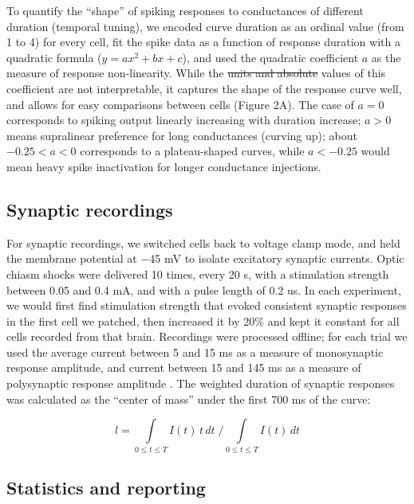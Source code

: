 \documentclass{article}
\providecommand{\DIFaddtex}[1]{{\protect\color{blue}\uwave{#1}}} %
\providecommand{\DIFdeltex}[1]{{\protect\color{red}\sout{#1}}}                      %
\providecommand{\DIFaddbegin}{} %
\providecommand{\DIFaddend}{} %
\providecommand{\DIFdelbegin}{} %
\providecommand{\DIFdelend}{} %
\providecommand{\DIFadd}[1]{\texorpdfstring{\DIFaddtex{#1}}{#1}} %
\providecommand{\DIFdel}[1]{\texorpdfstring{\DIFdeltex{#1}}{}} %
\newcommand{\DIFscaledelfig}{0.5}
\newlength{\DIFdelgraphicswidth} %
\newlength{\DIFdelgraphicsheight} %
\newcommand{\DIFaddincludegraphics}[2][]{{\color{blue}\fbox{\DIFOincludegraphics[#1]{#2}}}} %
\newcommand{\DIFdelincludegraphics}[2][]{%
\sbox{\DIFdelgraphicsbox}{\DIFOincludegraphics[#1]{#2}}%
\settoboxwidth{\DIFdelgraphicswidth}{\DIFdelgraphicsbox} %
\settoboxtotalheight{\DIFdelgraphicsheight}{\DIFdelgraphicsbox} %
\scalebox{\DIFscaledelfig}{%
\parbox[b]{\DIFdelgraphicswidth}{\usebox{\DIFdelgraphicsbox}\\[-\baselineskip] \rule{\DIFdelgraphicswidth}{0em}}\llap{\resizebox{\DIFdelgraphicswidth}{\DIFdelgraphicsheight}{%
\setlength{\unitlength}{\DIFdelgraphicswidth}%
\begin{picture}(1,1)%
\thicklines\linethickness{2pt} %
{\color[rgb]{1,0,0}\put(0,0){\framebox(1,1){}}}%
{\color[rgb]{1,0,0}\put(0,0){\line( 1,1){1}}}%
{\color[rgb]{1,0,0}\put(0,1){\line(1,-1){1}}}%
\end{picture}%
}\hspace*{3pt}}} %
} %
\DeclareRobustCommand{\DIFaddbegin}{\DIFOaddbegin \let\includegraphics\DIFaddincludegraphics} %
\DeclareRobustCommand{\DIFaddend}{\DIFOaddend \let\includegraphics\DIFOincludegraphics} %
\DeclareRobustCommand{\DIFdelbegin}{\DIFOdelbegin \let\includegraphics\DIFdelincludegraphics} %
\DeclareRobustCommand{\DIFdelend}{\DIFOaddend \let\includegraphics\DIFOincludegraphics} %
\begin{document}
To quantify the “shape” of spiking responses to conductances of different duration (temporal tuning), we encoded curve duration as an ordinal value (from 1 to 4) for every cell, fit the spike data as a function of response duration with a quadratic formula ($y = ax^2 + bx +c$), and used the quadratic coefficient $a$ as the measure of response non-linearity. While the \DIFdelbegin \DIFdel{units and absolute }\DIFdelend \DIFaddbegin \DIFadd{numerical }\DIFaddend values of this \DIFaddbegin \DIFadd{dimensionless }\DIFaddend coefficient are not \DIFaddbegin \DIFadd{easily }\DIFaddend interpretable, it captures the shape of the response curve well, and allows for easy comparisons between cells (Figure 2A). The case of $a=0$ corresponds to spiking output linearly increasing with duration increase; $a>0$ means supralinear preference for long conductances (curving up); about $-0.25<a<0$ corresponds to a plateau-shaped curves, while $a<-0.25$ would mean heavy spike inactivation for longer conductance injections. 

\subsection*{Synaptic recordings}

For synaptic recordings, we switched cells back to voltage clamp mode, and held the membrane potential at $-$45 mV to isolate excitatory synaptic currents. Optic chiasm shocks were delivered 10 times, every 20 s, with a stimulation strength between 0.05 and 0.4 mA, and with a pulse length of 0.2 us. In each experiment, we would first find stimulation strength that evoked consistent synaptic responses in the first cell we patched, then increased it by 20\% and kept it constant for all cells recorded from that brain. Recordings were processed offline; for each trial we used the average current between 5 and 15 ms as a measure of monosynaptic response amplitude, and current between 15 and 145 ms as a measure of polysynaptic response amplitude \citep{ciarleglio2015}. The weighted duration of synaptic responses was calculated as the “center of mass” under the first 700 ms of the curve:

$$\displaystyle l=\int\limits_{0 \leq t \leq T}{I(t)\, t \, dt} \; \Big/ \int\limits_{0 \leq t \leq T}{I(t) \, dt}$$

\subsection*{Statistics and reporting}
\end{document}
